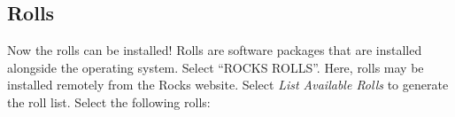 \documentclass[12pt]{article}
\begin{document}
%
%
%
%
%

\subsection{Rolls}

\qq Now the rolls can be installed! Rolls are software packages that are
installed alongside the operating system. Select ``ROCKS ROLLS''. Here, rolls
may be installed remotely from the Rocks website. Select \textit{List Available
  Rolls} to generate the roll list. Select the following rolls:
\end{document}
